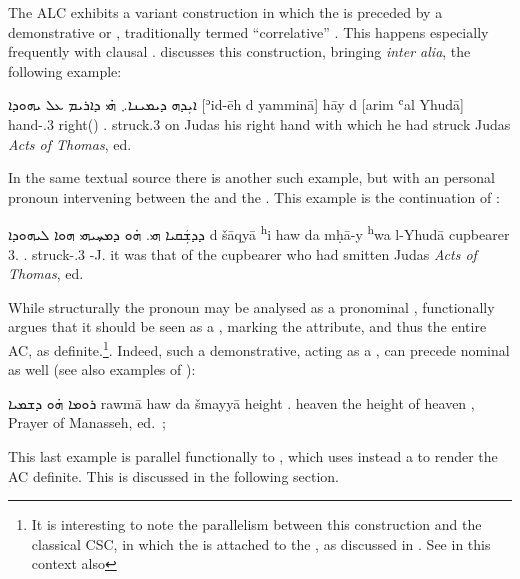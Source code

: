 {{{{The ALC exhibits a variant construction in which the \lnk* is  preceded by a demonstrative or , traditionally termed  \enquote{correlative} \citep[175f., \S 236]{NoldekeSyriac}. This happens especially frequently with clausal \secns. \citet{PatElCorrelative} discusses this construction, bringing \textit{inter alia}, the following example:

{ܐܝܼܕܗ ܕܝܡܝܢܐ܇ ܗ̇ܝ ܕܐܪܝܡ ܥܠ ܝܗܘܕܐ}
{[ʾid-ēh d\cb{} yamminā] hāy d\cb{} [arim ʿal Yhudā]}
{hand-\poss.3\masc{} \lnk\cb{} right(\fem) \dem.\fem{} \lnk\cb{} struck.3\masc{} on Judas}
{his right hand with which he had struck Judas}
{\textit{Acts of Thomas}, ed.\  \cite[]{WrightActs}}

 
In the same textual source there is another such example, but with an  personal pronoun intervening between the \prim and the . This example is the continuation of :

{ܕܕܫܲܩܝܐ ܗܝ. ܗ̇ܘ ܕܡܚ̣ܝܗܝ ܗܘܐ ܠܝܗܘܕܐ}
{d\cb{} šāqyā \cb{}\textsuperscript{h}i haw  da\cb{} mḥā-y \cb{}\textsuperscript{h}wa l-Yhudā}
{\lnk\cb{} cupbearer \cb{}3.\fem{} \dem.\masc{} \lnk\cb{} struck-\patient.3\masc{} \cb{}\pst{} \acc-J.}
{it was that of the cupbearer who had smitten Judas}
{\textit{Acts of Thomas}, ed.\ \cite[]{WrightActs}}

While structurally the pronoun may be analysed as a pronominal \prim \citep[see the analysis of][274]{WertheimerFunctions},  functionally \citeauthor{PatElCorrelative} argues that it should be seen as a , marking the attribute, and thus the entire AC, as definite.\footnote{It is interesting to note the parallelism between this construction and the classical  CSC, in which the  is attached to the \secn, as discussed in . See in this context also }. Indeed, such a demonstrative, acting as a , can precede nominal \prims as well (see also examples of \cite[67]{PatElCorrelative}):

{ܪܘܡܐ ܗ̇ܘ ܕܫܡܝܐ}
{rawmā haw da\cb{} šmayyā}
{height \dem.\masc{} \lnk\cb{} heaven}
{the height of heaven}
{\Pesh, Prayer of Manasseh, ed.\ \cite[A10]{BaarsSchneider}; \cite[91 (7A)]{GutmanVanPeursen}}\antipar\newpage

This last example is parallel functionally to , which uses instead a  to render the AC definite. This is discussed in the following section.





}}}}
